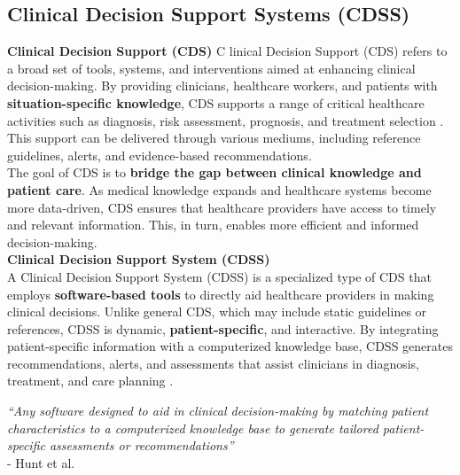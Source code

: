 \subsection{Clinical Decision Support Systems (CDSS)}
\textcolor{TUMBlue}{\textbf{Clinical Decision Support (CDS)}}
\noindent \lettrine{C}{ }linical Decision Support (CDS) refers to a broad set of tools, systems, and interventions aimed at enhancing clinical decision-making. By providing clinicians, healthcare workers, and patients with \textcolor{TUMRed}{\textbf{situation-specific knowledge}}, CDS supports a range of critical healthcare activities such as diagnosis, risk assessment, prognosis, and treatment selection \cite{osheroff2007roadmap}. This support can be delivered through various mediums, including reference guidelines, alerts, and evidence-based recommendations.\\[\baselineskip]

\noindent The goal of CDS is to \textcolor{TUMRed}{\textbf{bridge the gap between clinical knowledge and patient care}}. As medical knowledge expands and healthcare systems become more data-driven, CDS ensures that healthcare providers have access to timely and relevant information. This, in turn, enables more efficient and informed decision-making.\\[\baselineskip]

\noindent \textcolor{TUMBlue}{\textbf{Clinical Decision Support System (CDSS)}}\\
A Clinical Decision Support System (CDSS) is a specialized type of CDS that employs \textcolor{TUMRed}{\textbf{software-based tools}} to directly aid healthcare providers in making clinical decisions. Unlike general CDS, which may include static guidelines or references, CDSS is dynamic, \textcolor{TUMRed}{\textbf{patient-specific}}, and interactive. By integrating patient-specific information with a computerized knowledge base, CDSS generates recommendations, alerts, and assessments that assist clinicians in diagnosis, treatment, and care planning \cite{hunt1998effects}.

\begin{mdframed}[backgroundcolor=black!10]
    \centering
    \textit{“Any software designed to aid in clinical decision-making by matching patient characteristics to a computerized knowledge base to generate tailored patient-specific assessments or recommendations”}\\
    \flushright
    -  Hunt et al. \cite{hunt1998effects}
\end{mdframed}

